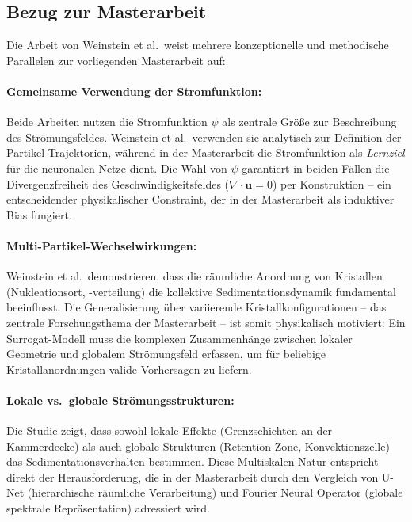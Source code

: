 \documentclass[a4paper,12pt]{article}
\begin{document}
\subsection*{Bezug zur Masterarbeit}

Die Arbeit von Weinstein et al.\ weist mehrere konzeptionelle und methodische Parallelen zur vorliegenden Masterarbeit auf:

\paragraph{Gemeinsame Verwendung der Stromfunktion:}
Beide Arbeiten nutzen die Stromfunktion $\psi$ als zentrale Größe zur Beschreibung des Strömungsfeldes. Weinstein et al.\ verwenden sie analytisch zur Definition der Partikel-Trajektorien, während in der Masterarbeit die Stromfunktion als \emph{Lernziel} für die neuronalen Netze dient. Die Wahl von $\psi$ garantiert in beiden Fällen die Divergenzfreiheit des Geschwindigkeitsfeldes ($\nabla \cdot \mathbf{u} = 0$) per Konstruktion -- ein entscheidender physikalischer Constraint, der in der Masterarbeit als induktiver Bias fungiert.

\paragraph{Multi-Partikel-Wechselwirkungen:}
Weinstein et al.\ demonstrieren, dass die räumliche Anordnung von Kristallen (Nukleationsort, -verteilung) die kollektive Sedimentationsdynamik fundamental beeinflusst. Die Generalisierung über variierende Kristallkonfigurationen -- das zentrale Forschungsthema der Masterarbeit -- ist somit physikalisch motiviert: Ein Surrogat-Modell muss die komplexen Zusammenhänge zwischen lokaler Geometrie und globalem Strömungsfeld erfassen, um für beliebige Kristallanordnungen valide Vorhersagen zu liefern.

\paragraph{Lokale vs.\ globale Strömungsstrukturen:}
Die Studie zeigt, dass sowohl lokale Effekte (Grenzschichten an der Kammerdecke) als auch globale Strukturen (Retention Zone, Konvektionszelle) das Sedimentationsverhalten bestimmen. Diese Multiskalen-Natur entspricht direkt der Herausforderung, die in der Masterarbeit durch den Vergleich von U-Net (hierarchische räumliche Verarbeitung) und Fourier Neural Operator (globale spektrale Repräsentation) adressiert wird.
\end{document}
